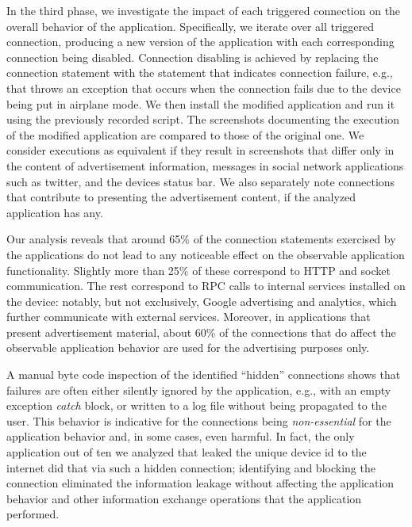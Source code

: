 In the third phase, we investigate the impact of each triggered connection on the overall behavior of the application.
Specifically, we iterate over all triggered connection, producing a new version of the application with each corresponding connection being disabled. Connection disabling is achieved by replacing the connection statement with the
statement that indicates connection failure, e.g., that throws an exception that occurs when the connection fails due to the device being put in airplane mode. 
We then install the modified application and run it using the previously recorded script. The screenshots documenting 
the execution of the modified application are compared to those of the original one. We consider executions as equivalent if they result in screenshots that differ only in the content of advertisement information, messages in social network applications such as twitter, and the devices status bar. 
We also separately note connections that contribute to presenting the advertisement content, if the analyzed application has any. 

Our analysis reveals that around 65\% of the connection statements exercised by the applications do not lead to any noticeable effect on the observable application functionality.
Slightly more than 25\% of these correspond to HTTP and socket communication. The rest correspond to RPC calls to internal services installed on the device: notably, but not exclusively, Google advertising and analytics, which further communicate with external services. 
Moreover, in applications that present advertisement material, about 60\% of the connections that do affect the observable application behavior are used for the advertising purposes only. 

A manual byte code inspection of the identified ``hidden'' connections shows that failures are often either silently ignored by the application, e.g., with an empty exception \emph{catch} block, or written to a log file without being propagated to the user. 
This behavior is indicative for the connections being \emph{non-essential} for the application behavior and, in some cases, even harmful. 
%
In fact, the only application out of ten we analyzed that leaked the unique device id to the internet did that via such a hidden connection; 
identifying and blocking the connection eliminated the information leakage without affecting the application behavior and other information exchange 
operations that the application performed. 


